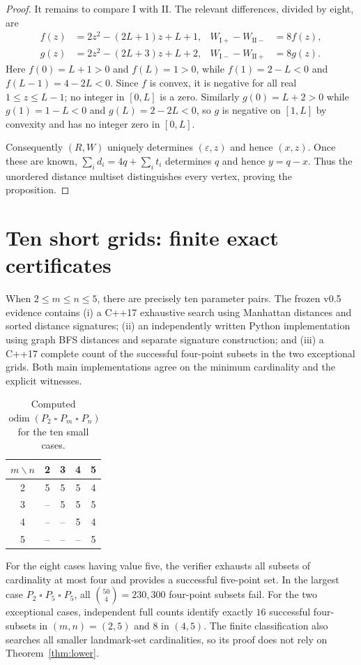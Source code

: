 \documentclass[10pt,a4paper]{article}
\newcommand{\odim}{\operatorname{odim}}
\newcommand{\boxp}{\mathbin{\square}}
\begin{document}
\begin{proof}
It remains to compare I with II. The relevant differences, divided by eight, are
\begin{align*}
f(z)&=2z^2-(2L+1)z+L+1,& W_{\mathrm{I+}}-W_{\mathrm{II-}}&=8f(z),\\
g(z)&=2z^2-(2L+3)z+L+2,& W_{\mathrm{I-}}-W_{\mathrm{II+}}&=8g(z).
\end{align*}
Here $f(0)=L+1>0$ and $f(L)=1>0$, while $f(1)=2-L<0$ and $f(L-1)=4-2L<0$. Since $f$ is convex, it is negative for all real $1\le z\le L-1$; no integer in $[0,L]$ is a zero. Similarly $g(0)=L+2>0$ while $g(1)=1-L<0$ and $g(L)=2-2L<0$, so $g$ is negative on $[1,L]$ by convexity and has no integer zero in $[0,L]$.

Consequently $(R,W)$ uniquely determines $(\varepsilon,z)$ and hence $(x,z)$. Once these are known, $\sum_i d_i=4q+\sum_i t_i$ determines $q$ and hence $y=q-x$. Thus the unordered distance multiset distinguishes every vertex, proving the proposition.
\end{proof}

\section{Ten short grids: finite exact certificates}\label{sec:finite}
When $2\le m\le n\le5$, there are precisely ten parameter pairs. The frozen v0.5 evidence contains (i) a C++17 exhaustive search using Manhattan distances and sorted distance signatures; (ii) an independently written Python implementation using graph BFS distances and separate signature construction; and (iii) a C++17 complete count of the successful four-point subsets in the two exceptional grids. Both main implementations agree on the minimum cardinality and the explicit witnesses.

\begin{table}[ht]\centering
\caption{Computed $\odim(P_2\boxp P_m\boxp P_n)$ for the ten small cases.}\label{tab:small}
\begin{tabular}{c@{\qquad}cccc}\toprule
$m\backslash n$ &2&3&4&5\\\midrule
2&5&5&5&4\\
3&--&5&5&5\\
4&--&--&5&4\\
5&--&--&--&5\\\bottomrule
\end{tabular}
\end{table}

For the eight cases having value five, the verifier exhausts all subsets of cardinality at most four and provides a successful five-point set. In the largest case $P_2\boxp P_5\boxp P_5$, all $\binom{50}{4}=230{,}300$ four-point subsets fail. For the two exceptional cases, independent full counts identify exactly $16$ successful four-subsets in $(m,n)=(2,5)$ and $8$ in $(4,5)$. The finite classification also searches all smaller landmark-set cardinalities, so its proof does not rely on Theorem~\ref{thm:lower}.
\end{document}
